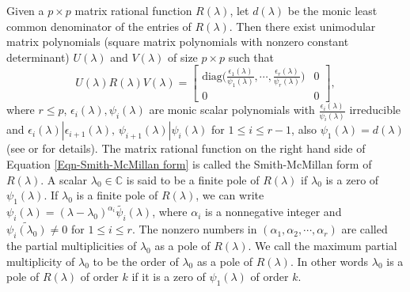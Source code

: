 \documentclass[12pt, reqno]{amsart}
\theoremstyle{definition}
\theoremstyle{remark}
\numberwithin{equation}{section}
\begin{document}
Given a $p \times p$ matrix rational function $R(\lambda)$, let $d(\lambda)$ be the monic 
least common denominator of the entries of $R(\lambda)$. Then there exist unimodular 
matrix polynomials (square matrix polynomials with nonzero constant determinant) 
$U(\lambda)$ and $V(\lambda)$ of size $p\times p$ such that 
\begin{equation} \label{Eqn-Smith-McMillan form}
U(\lambda) R(\lambda) V(\lambda) = \begin{bmatrix}
\displaystyle \text{diag}\bigg(\frac{\epsilon_1(\lambda)}{\psi_1(\lambda)},\cdots,
\frac{\epsilon_r(\lambda)}{\psi_r(\lambda)}\bigg) & 0 \\
0 & 0
\end{bmatrix},
\end{equation}
where $r \leq p$, $\epsilon_i(\lambda), \psi_i(\lambda)$ are monic scalar polynomials 
with 
$\displaystyle \frac{\epsilon_i(\lambda)}{\psi_i(\lambda)}$ irreducible and 
$\epsilon_i(\lambda)|\epsilon_{i+1}(\lambda), \, \psi_{i+1}(\lambda) | \psi_i(\lambda)$ 
for $1 \leq i \leq r-1$, also $\psi_1(\lambda) = d(\lambda)$ 
(see \cite{Rosenbrock} or \cite{Amparan-Dopico} for details). The matrix rational function 
on the right hand side of Equation \eqref{Eqn-Smith-McMillan form} is called the 
Smith-McMillan form of $R(\lambda)$. A scalar $\lambda_0 \in \mathbb{C}$ is said to be a 
finite pole of $R(\lambda)$ if $\lambda_0$ is a zero of $\psi_1(\lambda)$. If $\lambda_0$ 
is a finite pole of $R(\lambda)$, we can write 
$\psi_i(\lambda) = (\lambda - \lambda_0)^{\alpha_i} \tilde{\psi_i}(\lambda)$, 
where $\alpha_i$ is a nonnegative integer and $\tilde{\psi_i(\lambda_0)} \neq 0$ 
for $1\leq i \leq r$. The nonzero numbers in $(\alpha_1,\alpha_2,\cdots,\alpha_r)$ are 
called the partial multiplicities of $\lambda_0$ as a pole of $R(\lambda)$.  
We call the maximum partial multiplicity of $\lambda_0$ to be the order of $\lambda_0$ as 
a pole of $R(\lambda)$. In other words $\lambda_0$ is a pole of $R(\lambda)$ 
of order $k$ if it is a zero of $\psi_1(\lambda)$ of order $k$.
\end{document}
